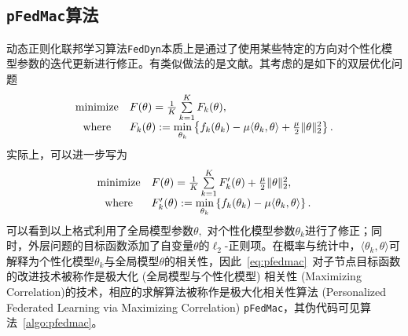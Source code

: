 \subsection*{\texttt{pFedMac}算法}

动态正则化联邦学习算法\texttt{FedDyn}本质上是通过了使用某些特定的方向对个性化模型参数的迭代更新进行修正。有类似做法的是文献\parencite{li2021pfedmac}。其考虑的是如下的双层优化问题
\begin{equation}
\label{eq:pfedmac}
\begin{array}{cl}
\operatorname*{minimize} & F(\theta) = \frac{1}{K} \sum\limits_{k=1}^K F_k(\theta), \\
\text{where} & F_k(\theta) := \mathop{\rm min}\limits_{\theta_k} \left\{ f_k(\theta_k) - \mu \langle \theta_k, \theta \rangle + \frac{\mu}{2} \lVert \theta \rVert^2_2 \right\}.
\end{array}
\end{equation}
实际上，可以进一步写为
\begin{equation}
\label{eq:pfedmac-adjusted}
\begin{array}{cl}
\operatorname*{minimize} & F(\theta) = \frac{1}{K} \sum\limits_{k=1}^K F_k'(\theta) + \frac{\mu}{2} \lVert \theta \rVert^2_2, \\
\text{where} & F_k'(\theta) := \mathop{\rm min}\limits_{\theta_k} \left\{ f_k(\theta_k) - \mu \langle \theta_k, \theta \rangle \right\}.
\end{array}
\end{equation}
可以看到以上格式利用了全局模型参数$\theta,$ 对个性化模型参数$\theta_k$进行了修正；同时，外层问题的目标函数添加了自变量$\theta$的$\ell_2$-正则项。在概率与统计中，$\langle \theta_k, \theta \rangle$可解释为个性化模型$\theta_k$与全局模型$\theta$的相关性，因此~\eqref{eq:pfedmac}~对子节点目标函数的改进技术被称作是极大化 (全局模型与个性化模型) 相关性 (Maximizing Correlation)的技术，相应的求解算法被称作是极大化相关性算法 (Personalized Federated Learning via Maximizing
Correlation) \texttt{pFedMac}，其伪代码可见算法~\ref{algo:pfedmac}。



